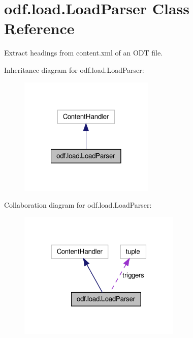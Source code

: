 \hypertarget{classodf_1_1load_1_1LoadParser}{\section{odf.\+load.\+Load\+Parser Class Reference}
\label{classodf_1_1load_1_1LoadParser}
}


Extract headings from content.\+xml of an O\+D\+T file.  




Inheritance diagram for odf.\+load.\+Load\+Parser\+:
\nopagebreak
\begin{figure}[H]
\begin{center}
\leavevmode
\includegraphics[width=182pt]{classodf_1_1load_1_1LoadParser__inherit__graph}
\end{center}
\end{figure}


Collaboration diagram for odf.\+load.\+Load\+Parser\+:
\nopagebreak
\begin{figure}[H]
\begin{center}
\leavevmode
\includegraphics[width=220pt]{classodf_1_1load_1_1LoadParser__coll__graph}
\end{center}
\end{figure}
